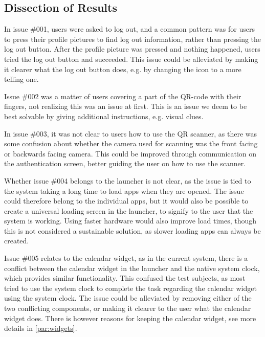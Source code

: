 \subsection{Dissection of Results}
In issue \#{}001, users were asked to log out, and a common pattern was for users to press their profile pictures to find log out information, rather than pressing the log out button. 
After the profile picture was pressed and nothing happened, users tried the log out button and succeeded. 
This issue could be alleviated by making it clearer what the log out button does, e.g. by changing the icon to a more telling one.\newline

Issue \#{}002 was a matter of users covering a part of the QR-code with their fingers, not realizing this was an issue at first. 
This is an issue we deem to be best solvable by giving additional instructions, e.g. visual clues. \newline

In issue \#{}003, it was not clear to users how to use the QR scanner, as there was some confusion about whether the camera used for scanning was the front facing or backwards facing camera. 
This could be improved through communication on the authentication screen, better guiding the user on how to use the scanner. \newline

Whether issue \#{}004 belongs to the launcher is not clear, as the issue is tied to the system taking a long time to load apps when they are opened. 
The issue could therefore belong to the individual apps, but it would also be possible to create a universal loading screen in the launcher, to signify to the user that the system is working. 
Using faster hardware would also improve load times, though this is not considered a sustainable solution, as slower loading apps can always be created. \newline

Issue \#{}005 relates to the calendar widget, as in the current system, there is a conflict between the calendar widget in the \giraf[] launcher and the native system clock, which provides similar functionality. 
This confused the test subjects, as most tried to use the system clock to complete the task regarding the calendar widget using the system clock. 
The issue could be alleviated by removing either of the two conflicting components, or making it clearer to the user what the calendar widget does. 
There is however reasons for keeping the calendar widget, see more details in \autoref{par:widgets}. \newline

